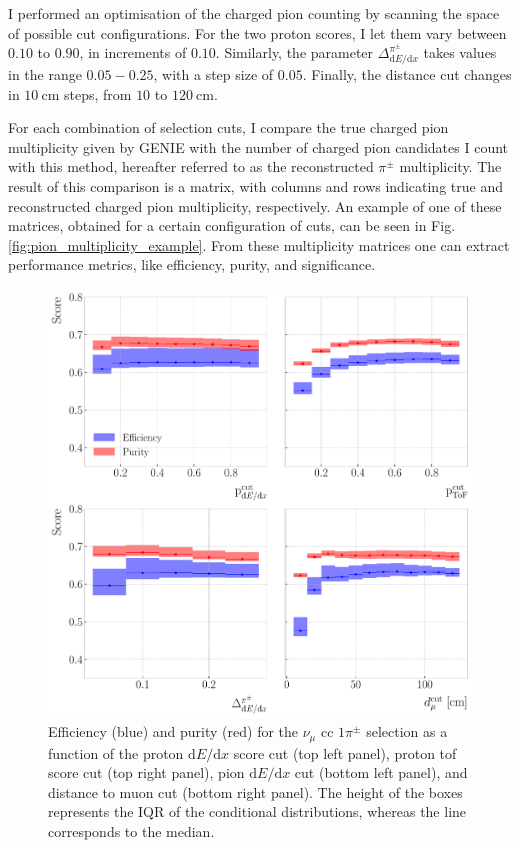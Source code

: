I performed an optimisation of the charged pion counting by scanning the space of possible cut configurations. For the two proton scores, I let them vary between $0.10$ to $0.90$, in increments of $0.10$. Similarly, the parameter $\Delta^{\pi^{\pm}}_{\mathrm{d}E/\mathrm{d}x}$ takes values in the range $0.05-0.25$, with a step size of $0.05$. Finally, the distance cut changes in $10~\mathrm{cm}$ steps, from $10$ to $120~\mathrm{cm}$.

For each combination of selection cuts, I compare the true charged pion multiplicity given by GENIE with the number of charged pion candidates I count with this method, hereafter referred to as the reconstructed $\pi^{\pm}$ multiplicity. The result of this comparison is a matrix, with columns and rows indicating true and reconstructed charged pion multiplicity, respectively. An example of one of these matrices, obtained for a certain configuration of cuts, can be seen in Fig. \ref{fig:pion_multiplicity_example}. From these multiplicity matrices one can extract performance metrics, like efficiency, purity, and significance.

\begin{figure}[t]
    \centering
    \includegraphics[width=.85\linewidth]{Images/GAr_selection/pion_selection_1_pions_metrics.pdf}
    \caption[Efficiency and purity for the $\nu_{\mu}$ \gls{cc} $1\pi^{\pm}$ selection as a function of the different cuts.]{Efficiency (blue) and purity (red) for the $\nu_{\mu}$ \gls{cc} $1\pi^{\pm}$ selection as a function of the proton $\mathrm{d}E/\mathrm{d}x$ score cut (top left panel), proton \gls{tof} score cut (top right panel), pion $\mathrm{d}E/\mathrm{d}x$ cut (bottom left panel), and distance to muon cut (bottom right panel). The height of the boxes represents the IQR of the conditional distributions, whereas the line corresponds to the median.}
    \label{fig:pion_selection_1_pions_metrics}
\end{figure}

